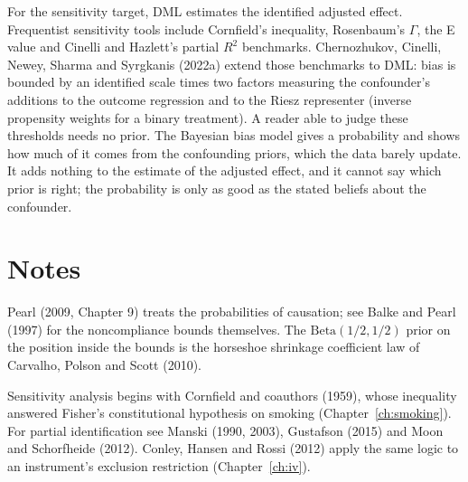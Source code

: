 For the sensitivity target, DML estimates the identified adjusted effect. Frequentist sensitivity tools include Cornfield's inequality, Rosenbaum's $\Gamma$, the E value and Cinelli and Hazlett's partial $R^2$ benchmarks. Chernozhukov, Cinelli, Newey, Sharma and Syrgkanis (2022a) extend those benchmarks to DML: bias is bounded by an identified scale times two factors measuring the confounder's additions to the outcome regression and to the Riesz representer (inverse propensity weights for a binary treatment). A reader able to judge these thresholds needs no prior. The Bayesian bias model gives a probability and shows how much of it comes from the confounding priors, which the data barely update. It adds nothing to the estimate of the adjusted effect, and it cannot say which prior is right; the probability is only as good as the stated beliefs about the confounder.

\section*{Notes}

Pearl (2009, Chapter 9) treats the probabilities of causation; see Balke and Pearl (1997) for the noncompliance bounds themselves. The $\mathrm{Beta}(1/2, 1/2)$ prior on the position inside the bounds is the horseshoe shrinkage coefficient law of Carvalho, Polson and Scott (2010).

Sensitivity analysis begins with Cornfield and coauthors (1959), whose inequality answered Fisher's constitutional hypothesis on smoking (Chapter~\ref{ch:smoking}). For partial identification see Manski (1990, 2003), Gustafson (2015) and Moon and Schorfheide (2012). Conley, Hansen and Rossi (2012) apply the same logic to an instrument's exclusion restriction (Chapter~\ref{ch:iv}).

